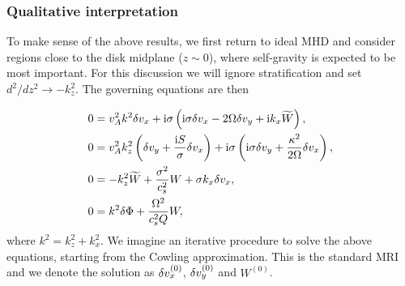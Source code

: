 \subsubsection{Qualitative interpretation} 
To make sense of the above results, we first return to ideal MHD and 
consider regions close to the disk midplane ($z\sim 0$), where
self-gravity is expected to be most important. For this discussion we
will ignore stratification and set $d^2/dz^2\to -k_z^2$. The governing
equations are then 

\begin{align}
  &  0= v_A^2k^2\delta v_x + \mathrm{i}\sigma\left(\mathrm{i}\sigma \delta v_x - 2\Omega\delta v_y + \mathrm{i} k_x \widetilde{W}\right),\label{simp1}\\
  &  0= v_A^2k_z^2\left(\delta v_y + \frac{\mathrm{i} S
  }{\sigma}\delta v_x\right) + \mathrm{i}\sigma\left(\mathrm{i}\sigma\delta v_y +
  \frac{\kappa^2}{2\Omega}\delta v_x\right),\label{simp2}\\
  & 0 = -k_z^2\widetilde{W} + \frac{\sigma^2}{c_s^2}W + \sigma k_x \delta v_x, \label{simp3}\\
  & 0 = k^2\delta \Phi + \frac{\Omega^2}{c_s^2Q}W,\label{simp4}
\end{align}
where $k^2 = k_z^2 + k_x^2$. We imagine an iterative procedure to
solve the above equations, starting from the Cowling approximation. 
This is the standard MRI and we denote the solution as
$\delta v_x^{(0)}$, $\delta v_y^{(0)}$ and $W^{(0)}$. 

